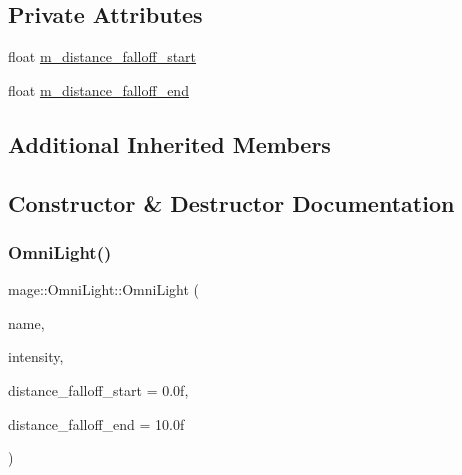\subsection*{Private Attributes}
\begin{DoxyCompactItemize}
\item 
float \hyperlink{classmage_1_1_omni_light_ab784744d39ad3d4f4a7b2214a55108f7}{m\+\_\+distance\+\_\+falloff\+\_\+start}
\item 
float \hyperlink{classmage_1_1_omni_light_a4ee5cc4103305dc96b43d6286858ef74}{m\+\_\+distance\+\_\+falloff\+\_\+end}
\end{DoxyCompactItemize}
\subsection*{Additional Inherited Members}


\subsection{Constructor \& Destructor Documentation}
\hypertarget{classmage_1_1_omni_light_a245aeb25833cbc86cb75909432b60edc}{}\label{classmage_1_1_omni_light_a245aeb25833cbc86cb75909432b60edc} 
\subsubsection{\texorpdfstring{Omni\+Light()}{OmniLight()}\hspace{0.1cm}{\footnotesize\ttfamily [1/3]}}
{\footnotesize\ttfamily mage\+::\+Omni\+Light\+::\+Omni\+Light (\begin{DoxyParamCaption}\item[{const string}]{name,  }\item[{const \hyperlink{structmage_1_1_r_g_b_spectrum}{R\+G\+B\+Spectrum} \&}]{intensity,  }\item[{float}]{distance\+\_\+falloff\+\_\+start = {\ttfamily 0.0f},  }\item[{float}]{distance\+\_\+falloff\+\_\+end = {\ttfamily 10.0f} }\end{DoxyParamCaption})\hspace{0.3cm}{\ttfamily [explicit]}}

\hypertarget{classmage_1_1_omni_light_a090be5e95e1c3d6c43e80ad7fae10794}{}\label{classmage_1_1_omni_light_a090be5e95e1c3d6c43e80ad7fae10794} 
